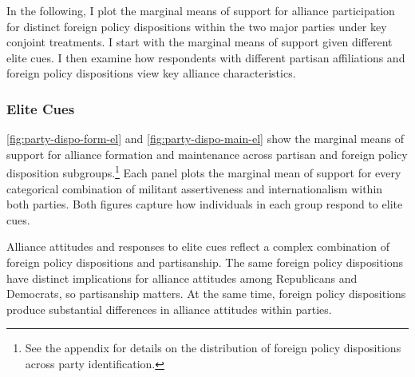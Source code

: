 \documentclass[12pt]{article}
\begin{document}
In the following, I plot the marginal means of support for alliance participation for distinct foreign policy dispositions within the two major parties under key conjoint treatments.  
I start with the marginal means of support given different elite cues. 
I then examine how respondents with different partisan affiliations and foreign policy dispositions view key alliance characteristics. 


\subsubsection{Elite Cues}


\autoref{fig:party-dispo-form-el} and \autoref{fig:party-dispo-main-el} show the marginal means of support for alliance formation and maintenance across partisan and foreign policy disposition subgroups.\footnote{See the appendix for details on the distribution of foreign policy dispositions across party identification.} 
Each panel plots the marginal mean of support for every categorical combination of militant assertiveness and internationalism within both parties. 
Both figures capture how individuals in each group respond to elite cues. 


Alliance attitudes and responses to elite cues reflect a complex combination of foreign policy dispositions and partisanship. 
The same foreign policy dispositions have distinct implications for alliance attitudes among Republicans and Democrats, so partisanship matters.
At the same time, foreign policy dispositions produce substantial differences in alliance attitudes within parties.  
\end{document}
